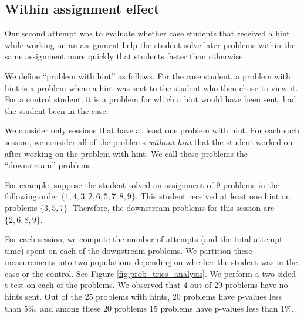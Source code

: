 \documentclass{llncs2e/llncs}
\begin{document}
\subsection{Within assignment effect}

Our second attempt was to evaluate whether case students that received a hint while working on an assignment help the student solve later problems within the same assignment more quickly that students faster than otherwise.

We define ``problem with hint'' as follows. For the case student, a problem with hint is a problem where a hint was sent to the student who then chose to view it. For a control student, it is a problem for which a hint would have been sent, had the student been in the case.

We consider only sessions that have at least one problem with hint. For each such session, we consider all of the problems {\em without hint} that the student worked on after working on the problem with hint. We call these problems the ``downstream'' problems.

For example, suppose the student solved an assignment of 9 problems in the following order $\{ 1, 4, 3, 2, 6, 5, 7, 8, 9\}$. This student received at least one hint on problems $\{3, 5, 7\}$. Therefore, the downstream problems for this session are $\{2, 6, 8, 9\}$.

For each session, we compute the number of attempts (and the total attempt time) spent on each of the downstream problems. We partition these measurements into two populations depending on whether the student was in the case or the control. See Figure \ref{fig:prob_tries_analysis}. We perform a two-sided t-test on each of the problems. We observed that 4 out of 29 problems have no hints sent. Out of the 25 problems with hints, 20 problems have p-values less than $5\%$, and among these 20 problems 15 problems have p-values less than $1\%$.
\end{document}
